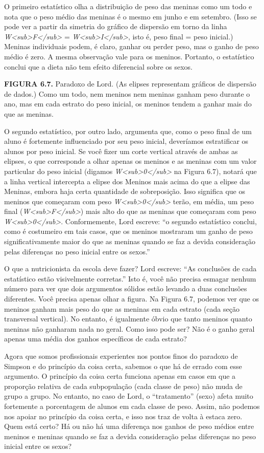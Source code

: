 \documentclass[11pt,a5paper,twoside]{book}
\begin{document}
O primeiro estatístico olha a distribuição de peso das meninas como um todo e nota que o peso médio das meninas é o mesmo em junho e em setembro. (Isso se pode ver a partir da simetria do gráfico de dispersão em torno da linha \textit{W<sub>F</sub>} = \textit{W<sub>I</sub>}, isto é, peso final = peso inicial.) Meninas individuais podem, é claro, ganhar ou perder peso, mas o ganho de peso médio é zero. A mesma observação vale para os meninos. Portanto, o estatístico conclui que a dieta não tem efeito diferencial sobre os sexos.

\textbf{FIGURA 6.7.} Paradoxo de Lord. (As elipses representam gráficos de dispersão de dados.) Como um todo, nem meninos nem meninas ganham peso durante o ano, mas em cada estrato do peso inicial, os meninos tendem a ganhar mais do que as meninas.

O segundo estatístico, por outro lado, argumenta que, como o peso final de um aluno é fortemente influenciado por seu peso inicial, deveríamos estratificar os alunos por peso inicial. Se você fizer um corte vertical através de ambas as elipses, o que corresponde a olhar apenas os meninos e as meninas com um valor particular do peso inicial (digamos \textit{W<sub>0</sub>} na Figura 6.7), notará que a linha vertical intercepta a elipse dos Meninos mais acima do que a elipse das Meninas, embora haja certa quantidade de sobreposição. Isso significa que os meninos que começaram com peso \textit{W<sub>0</sub>} terão, em média, um peso final (\textit{W<sub>F</sub>}) mais alto do que as meninas que começaram com peso \textit{W<sub>0</sub>}. Conformemente, Lord escreve: “o segundo estatístico conclui, como é costumeiro em tais casos, que os meninos mostraram um ganho de peso significativamente maior do que as meninas quando se faz a devida consideração pelas diferenças no peso inicial entre os sexos.”

O que a nutricionista da escola deve fazer? Lord escreve: “As conclusões de cada estatístico estão visivelmente corretas.” Isto é, você não precisa esmagar nenhum número para ver que dois argumentos sólidos estão levando a duas conclusões diferentes. Você precisa apenas olhar a figura. Na Figura 6.7, podemos ver que os meninos ganham mais peso do que as meninas em cada estrato (cada seção transversal vertical). No entanto, é igualmente óbvio que tanto meninos quanto meninas não ganharam nada no geral. Como isso pode ser? Não é o ganho geral apenas uma média dos ganhos específicos de cada estrato?

Agora que somos profissionais experientes nos pontos finos do paradoxo de Simpson e do princípio da coisa certa, sabemos o que há de errado com esse argumento. O princípio da coisa certa funciona apenas em casos em que a proporção relativa de cada subpopulação (cada classe de peso) não muda de grupo a grupo. No entanto, no caso de Lord, o “tratamento” (sexo) afeta muito fortemente a porcentagem de alunos em cada classe de peso. Assim, não podemos nos apoiar no princípio da coisa certa, e isso nos traz de volta à estaca zero. Quem está certo? Há ou não há uma diferença nos ganhos de peso médios entre meninos e meninas quando se faz a devida consideração pelas diferenças no peso inicial entre os sexos?
\end{document}
